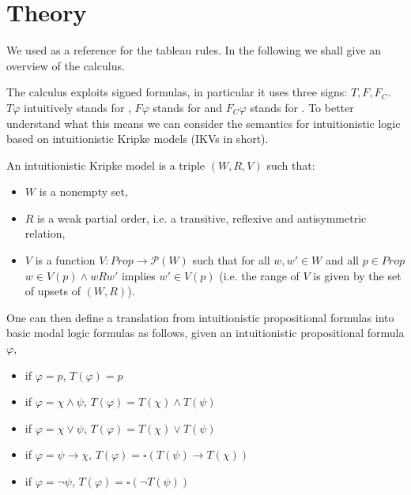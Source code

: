 
\section{Theory}

We used \cite{miglioli1994improved} as a reference for the tableau rules. In the following we shall give an overview of the calculus. 

The calculus exploits signed formulas, in particular it uses three signs: $T,F,F_C$. $T \varphi$ intuitively stands for , $F \varphi$ stands for  and $F_C \varphi$ stands for .
To better understand what this means we can consider the semantics for intuitionistic logic based on intuitionistic Kripke models (IKVs in short).
\begin{definition}
    An intuitionistic Kripke model is a triple $(W,R,V)$ such that:
    \begin{itemize}
        \item $W$ is a nonempty set,
        \item $R$ is a weak partial order, i.e. a transitive, reflexive and antisymmetric relation,
        \item $V$ is a function $V : Prop \rightarrow \mathcal{P}(W)$ such that for all $w,w' \in W$ and all $p \in Prop$ $w \in V(p) \land wRw'$ implies $w' \in V(p)$ (i.e. the range of $V$ is given by the set of upsets of $(W,R)$).
    \end{itemize}
\end{definition}

One can then define a translation from intuitionistic propositional formulas into basic modal logic formulas as follows, given an intuitionistic propositional formula $\varphi$,
\begin{itemize}
    \item if $\varphi=p$, $T(\varphi)=p$
    \item if $\varphi= \chi \land \psi$, $T(\varphi)= T(\chi) \land T(\psi)$
    \item if $\varphi= \chi \lor \psi$, $T(\varphi)= T(\chi) \lor T(\psi)$
    \item if $\varphi=\psi \rightarrow \chi$, $T(\varphi)=\square (T(\psi) \rightarrow T(\chi))$
    \item if $\varphi= \neg \psi$, $T(\varphi)= \square (\neg T(\psi))$
\end{itemize}

